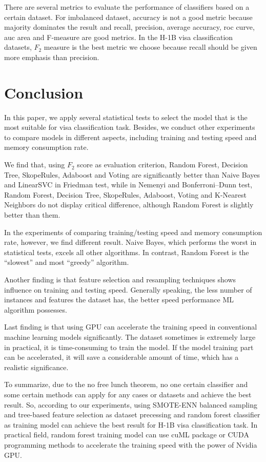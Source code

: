 There are several metrics to evaluate the performance of classifiers based on a certain dataset. For imbalanced dataset, accuracy is not a good metric because majority dominates the result and recall, precision, average accuracy, roc curve, auc area and F-measure are good metrics. In the H-1B visa classification datasets, $F_2$ measure is the best metric we choose because recall should be given more emphasis than precision.

\section{Conclusion}
In this paper, we apply several statistical tests to select the model that is the most suitable for visa classification task. Besides, we conduct other experiments to compare models in different aspects, including training and testing speed and memory consumption rate.

We find that, using $F_2$ score as evaluation criterion, Random Forest, Decision Tree, SkopeRules, Adaboost and Voting are significantly better than Naive Bayes and LinearSVC in Friedman test, while in Nemenyi and Bonferroni–Dunn test, Random Forest, Decision Tree, SkopeRules, Adaboost, Voting and K-Nearest Neighbors do not display critical difference, although Random Forest is slightly better than them.

In the experiments of comparing training/testing speed and memory consumption rate, however, we find different result. Naive Bayes, which performs the worst in statistical tests, excels all other algorithms. In contrast, Random Forest is the “slowest” and most “greedy” algorithm.

Another finding is that feature selection and resampling techniques shows influence on training and testing speed. Generally speaking, the less number of instances and features the dataset has, the better speed performance ML algorithm possesses.

Last finding is that using GPU can accelerate the training speed in conventional machine learning models significantly. The dataset sometimes is extremely large in practical, it is time-consuming to train the model. If the model training part can be accelerated, it will save a considerable amount of time, which has a realistic significance.

To summarize, due to the no free lunch theorem, no one certain classifier and some certain methods can apply for any cases or datasets and achieve the best result. So, according to our experiments, using SMOTE-ENN balanced sampling and tree-based feature selection as dataset precessing and random forest classifier as training model can achieve the best result for H-1B visa classification task. In practical field, random forest training model can use cuML package or CUDA programming methods to accelerate the training speed with the power of Nvidia GPU. 

